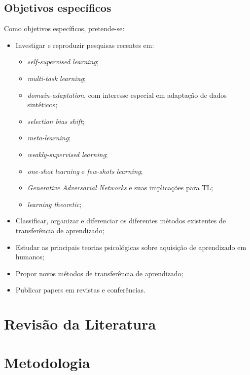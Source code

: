 \documentclass[
12pt, %
a4paper, %
onecolumn, %
]{article}
\begin{document}
\subsection{Objetivos específicos}
Como objetivos específicos, pretende-se:
\begin{itemize}
\item Investigar e reproduzir pesquisas recentes em:
\begin{itemize}
  \item \textit{self-supervised learning};
  \item \textit{multi-task learning};
  \item \textit{domain-adaptation}, com interesse especial em adaptação de dados sintéticos;
  \item \textit{selection bias shift};
  \item \textit{meta-learning};
  \item \textit{weakly-supervised learning};
  \item \textit{one-shot learning} e \textit{few-shots learning};
  \item \textit{Generative Adversarial Networks} e suas implicações para TL;
  \item \textit{learning theoretic};
\end{itemize}
\item Classificar, organizar e diferenciar os diferentes métodos existentes de transferência de aprendizado;
\item Estudar as principais teorias psicológicas sobre aquisição de aprendizado em humanos; 
\item Propor novos métodos de transferência de aprendizado;
\item Publicar papers em revistas e conferências.
\end{itemize}


\section{Revisão da Literatura}





\section{Metodologia}
\end{document}
